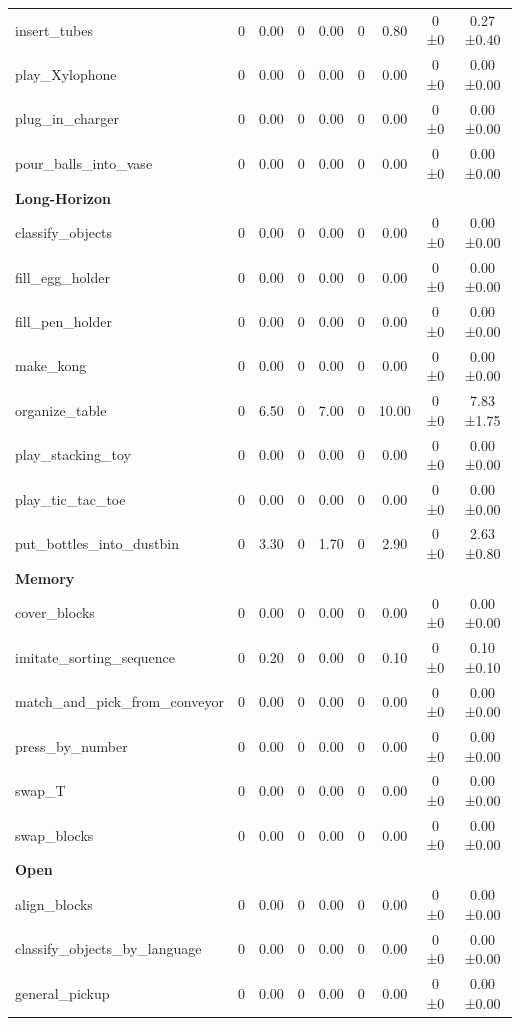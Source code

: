\begin{table}[H]
{\begin{tabular}{l|c|c|c|c|c|c|c|c}
insert\_tubes & 0 & 0.00 & 0 & 0.00 & 0 & 0.80 & 0 ±0 & 0.27 ±0.40 \\
play\_Xylophone & 0 & 0.00 & 0 & 0.00 & 0 & 0.00 & 0 ±0 & 0.00 ±0.00 \\
plug\_in\_charger & 0 & 0.00 & 0 & 0.00 & 0 & 0.00 & 0 ±0 & 0.00 ±0.00 \\
pour\_balls\_into\_vase & 0 & 0.00 & 0 & 0.00 & 0 & 0.00 & 0 ±0 & 0.00 ±0.00 \\
\hline
\multicolumn{9}{l}{\textbf{Long-Horizon}} \\
classify\_objects & 0 & 0.00 & 0 & 0.00 & 0 & 0.00 & 0 ±0 & 0.00 ±0.00 \\
fill\_egg\_holder & 0 & 0.00 & 0 & 0.00 & 0 & 0.00 & 0 ±0 & 0.00 ±0.00 \\
fill\_pen\_holder & 0 & 0.00 & 0 & 0.00 & 0 & 0.00 & 0 ±0 & 0.00 ±0.00 \\
make\_kong & 0 & 0.00 & 0 & 0.00 & 0 & 0.00 & 0 ±0 & 0.00 ±0.00 \\
organize\_table & 0 & 6.50 & 0 & 7.00 & 0 & 10.00 & 0 ±0 & 7.83 ±1.75 \\
play\_stacking\_toy & 0 & 0.00 & 0 & 0.00 & 0 & 0.00 & 0 ±0 & 0.00 ±0.00 \\
play\_tic\_tac\_toe & 0 & 0.00 & 0 & 0.00 & 0 & 0.00 & 0 ±0 & 0.00 ±0.00 \\
put\_bottles\_into\_dustbin & 0 & 3.30 & 0 & 1.70 & 0 & 2.90 & 0 ±0 & 2.63 ±0.80 \\
\hline
\multicolumn{9}{l}{\textbf{Memory}} \\
cover\_blocks & 0 & 0.00 & 0 & 0.00 & 0 & 0.00 & 0 ±0 & 0.00 ±0.00 \\
imitate\_sorting\_sequence & 0 & 0.20 & 0 & 0.00 & 0 & 0.10 & 0 ±0 & 0.10 ±0.10 \\
match\_and\_pick\_from\_conveyor & 0 & 0.00 & 0 & 0.00 & 0 & 0.00 & 0 ±0 & 0.00 ±0.00 \\
press\_by\_number & 0 & 0.00 & 0 & 0.00 & 0 & 0.00 & 0 ±0 & 0.00 ±0.00 \\
swap\_T & 0 & 0.00 & 0 & 0.00 & 0 & 0.00 & 0 ±0 & 0.00 ±0.00 \\
swap\_blocks & 0 & 0.00 & 0 & 0.00 & 0 & 0.00 & 0 ±0 & 0.00 ±0.00 \\
\hline
\multicolumn{9}{l}{\textbf{Open}} \\
align\_blocks & 0 & 0.00 & 0 & 0.00 & 0 & 0.00 & 0 ±0 & 0.00 ±0.00 \\
classify\_objects\_by\_language & 0 & 0.00 & 0 & 0.00 & 0 & 0.00 & 0 ±0 & 0.00 ±0.00 \\
general\_pickup & 0 & 0.00 & 0 & 0.00 & 0 & 0.00 & 0 ±0 & 0.00 ±0.00 \\

\end{tabular}}
\end{table}
